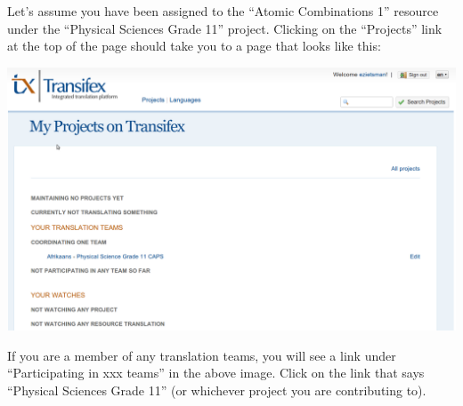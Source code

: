 \documentclass[12pt, a4paper]{article}
\begin{document}
Let's assume you have been assigned to the ``Atomic Combinations 1'' resource under the ``Physical Sciences Grade 11'' project. Clicking on the ``Projects'' link at the top of the page should take you to a page that looks like this:
\begin{center}
    \centerline{\includegraphics[width=0.8\paperwidth]{images/selectproject.png}}
\end{center}
If you are a member of any translation teams, you will see a link under ``Participating in xxx teams'' in the above image. Click on the link that says ``Physical Sciences Grade 11'' (or whichever project you are contributing to).
\end{document}
